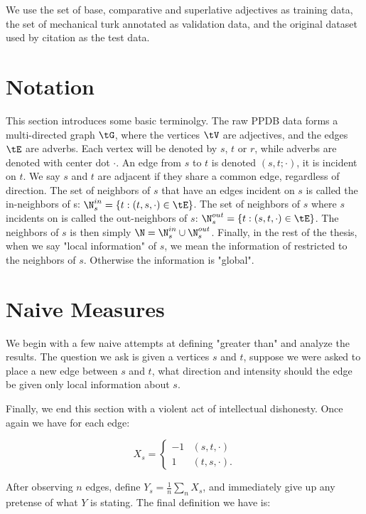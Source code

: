 We use the set of base, comparative and superlative adjectives as training data, the set of mechanical turk annotated as validation data, and the original dataset used by {citation} as the test data. 

\section{Notation}

This section introduces some basic terminolgy. The raw PPDB data forms a multi-directed graph $\tG$, where the vertices $\tV$ are adjectives, and the edges $\tE$ are adverbs. Each vertex will be denoted by $s$, $t$ or $r$, while adverbs are denoted with center dot $\cdot$. An edge from $s$ to $t$ is denoted $(s,t; \cdot)$, it is incident on $t$. We say $s$ and $t$ are adjacent if they share a common edge, regardless of direction. The set of neighbors of $s$ that have an edges incident on $s$ is called the in-neighbors of s: $\N^{in}_s = \{ t : (t,s, \cdot) \in \tE \}$. The set of neighbors of $s$ where $s$ incidents on is called the out-neighbors of $s$: $\N^{out}_s = \{ t : (s,t, \cdot) \in \tE \}$. The neighbors of $s$ is then simply $\N = \N^{in}_s \cup \N^{out}_s$. Finally, in the rest of the thesis, when we say "local information" of $s$, we mean the information of restricted to the neighbors of $s$. Otherwise the information is "global".

\section{Naive Measures}

We begin with a few naive attempts at defining "greater than" and analyze the results. The question we ask is given a vertices $s$ and $t$, suppose we were asked to place a new edge between $s$ and $t$, what direction and intensity should the edge be given only local information about $s$.


Finally, we end this section with a violent act of intellectual dishonesty. Once again we have for each edge:
 	
\begin{equation}
X_{s} = \begin{cases} 
	-1 & (s,t, \cdot) \\
	1  & (t,s, \cdot).
\end{cases}
\end{equation}

After observing $n$ edges, define $Y_s = \frac{1}{n} \sum_n X_{s}$, and immediately give up any pretense of what $Y$ is stating. The final definition we have is:

